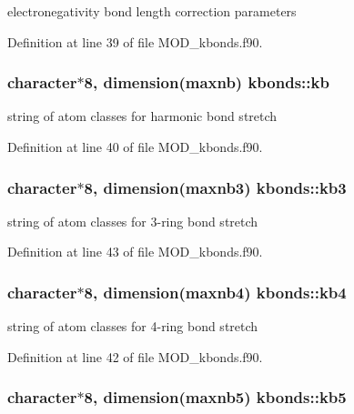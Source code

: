 electronegativity bond length correction parameters 



Definition at line 39 of file M\-O\-D\-\_\-kbonds.\-f90.

\hypertarget{classkbonds_ab73fca798f003a8ca65b167648b1aaa8}{
\subsubsection[{kb}]{\setlength{\rightskip}{0pt plus 5cm}character$\ast$8, dimension({\bf maxnb}) kbonds\-::kb}}\label{classkbonds_ab73fca798f003a8ca65b167648b1aaa8}


string of atom classes for harmonic bond stretch 



Definition at line 40 of file M\-O\-D\-\_\-kbonds.\-f90.

\hypertarget{classkbonds_ad70e37dfe5398cf66dfaa94a974270c5}{
\subsubsection[{kb3}]{\setlength{\rightskip}{0pt plus 5cm}character$\ast$8, dimension({\bf maxnb3}) kbonds\-::kb3}}\label{classkbonds_ad70e37dfe5398cf66dfaa94a974270c5}


string of atom classes for 3-\/ring bond stretch 



Definition at line 43 of file M\-O\-D\-\_\-kbonds.\-f90.

\hypertarget{classkbonds_ab434179eab14e342f2414151414e63b7}{
\subsubsection[{kb4}]{\setlength{\rightskip}{0pt plus 5cm}character$\ast$8, dimension({\bf maxnb4}) kbonds\-::kb4}}\label{classkbonds_ab434179eab14e342f2414151414e63b7}


string of atom classes for 4-\/ring bond stretch 



Definition at line 42 of file M\-O\-D\-\_\-kbonds.\-f90.

\hypertarget{classkbonds_a36d4806e8cea51b4ee028732e8b0fe49}{
\subsubsection[{kb5}]{\setlength{\rightskip}{0pt plus 5cm}character$\ast$8, dimension({\bf maxnb5}) kbonds\-::kb5}}\label{classkbonds_a36d4806e8cea51b4ee028732e8b0fe49}


